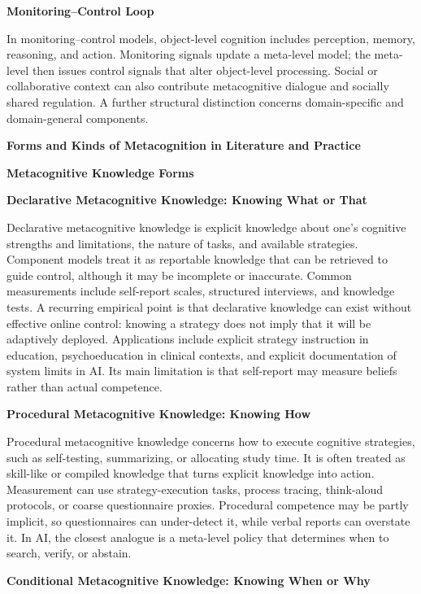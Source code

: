 \documentclass{book}
\providecommand{\ProjectDeepHeading}[2]{%
    \par\medskip\noindent\textbf{#2}\par\smallskip
}
\begin{document}
   \ProjectDeepHeading{6}{Monitoring--Control Loop}

   In monitoring--control models, object-level cognition includes perception, memory, reasoning, and action. Monitoring signals update a meta-level model; the meta-level then issues control signals that alter object-level processing. Social or collaborative context can also contribute metacognitive dialogue and socially shared regulation. A further structural distinction concerns domain-specific and domain-general components.

   \ProjectDeepHeading{5}{Forms and Kinds of Metacognition in Literature and Practice}

   \ProjectDeepHeading{6}{Metacognitive Knowledge Forms}

   \ProjectDeepHeading{7}{Declarative Metacognitive Knowledge: Knowing What or That}

   Declarative metacognitive knowledge is explicit knowledge about one's cognitive strengths and limitations, the nature of tasks, and available strategies. Component models treat it as reportable knowledge that can be retrieved to guide control, although it may be incomplete or inaccurate. Common measurements include self-report scales, structured interviews, and knowledge tests. A recurring empirical point is that declarative knowledge can exist without effective online control: knowing a strategy does not imply that it will be adaptively deployed. Applications include explicit strategy instruction in education, psychoeducation in clinical contexts, and explicit documentation of system limits in AI. Its main limitation is that self-report may measure beliefs rather than actual competence.

   \ProjectDeepHeading{7}{Procedural Metacognitive Knowledge: Knowing How}

   Procedural metacognitive knowledge concerns how to execute cognitive strategies, such as self-testing, summarizing, or allocating study time. It is often treated as skill-like or compiled knowledge that turns explicit knowledge into action. Measurement can use strategy-execution tasks, process tracing, think-aloud protocols, or coarse questionnaire proxies. Procedural competence may be partly implicit, so questionnaires can under-detect it, while verbal reports can overstate it. In AI, the closest analogue is a meta-level policy that determines when to search, verify, or abstain.

   \ProjectDeepHeading{7}{Conditional Metacognitive Knowledge: Knowing When or Why}
\end{document}
